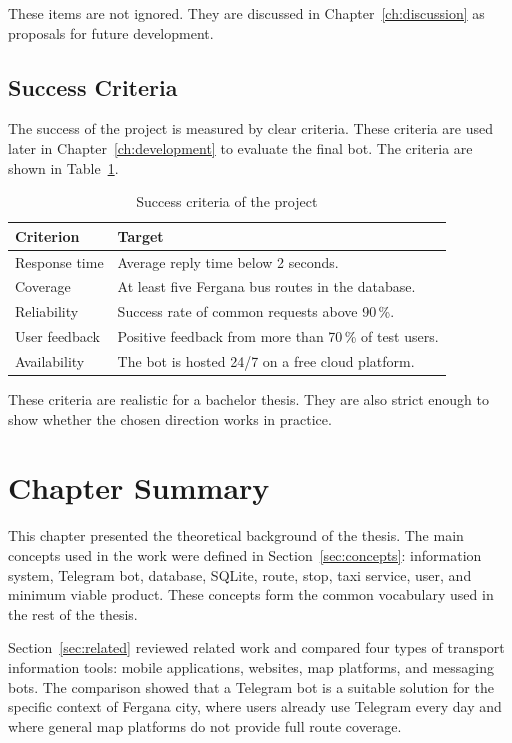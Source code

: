 These items are not ignored. They are discussed in
Chapter~\ref{ch:discussion} as proposals for future development.

\subsection{Success Criteria}
\label{subsec:success}

The success of the project is measured by clear criteria. These
criteria are used later in Chapter~\ref{ch:development} to evaluate the
final bot. The criteria are shown in Table~\ref{tab:success-criteria}.

\begin{table}[h]
\centering
\caption{Success criteria of the project}
\label{tab:success-criteria}
\begin{tabular}{lp{}}
\hline
\textbf{Criterion} & \textbf{Target} \\
\hline
Response time & Average reply time below 2 seconds. \\
Coverage & At least five Fergana bus routes in the database. \\
Reliability & Success rate of common requests above 90\,\%. \\
User feedback & Positive feedback from more than 70\,\% of test users. \\
Availability & The bot is hosted 24/7 on a free cloud platform. \\
\hline
\end{tabular}
\end{table}

These criteria are realistic for a bachelor thesis. They are also
strict enough to show whether the chosen direction works in practice.

\section{Chapter Summary}
\label{sec:ch1-summary}

This chapter presented the theoretical background of the thesis. The
main concepts used in the work were defined in Section~\ref{sec:concepts}:
information system, Telegram bot, database, SQLite, route, stop, taxi
service, user, and minimum viable product. These concepts form the
common vocabulary used in the rest of the thesis.

Section~\ref{sec:related} reviewed related work and compared four types
of transport information tools: mobile applications, websites, map
platforms, and messaging bots. The comparison showed that a Telegram
bot is a suitable solution for the specific context of Fergana city,
where users already use Telegram every day and where general map
platforms do not provide full route coverage.

